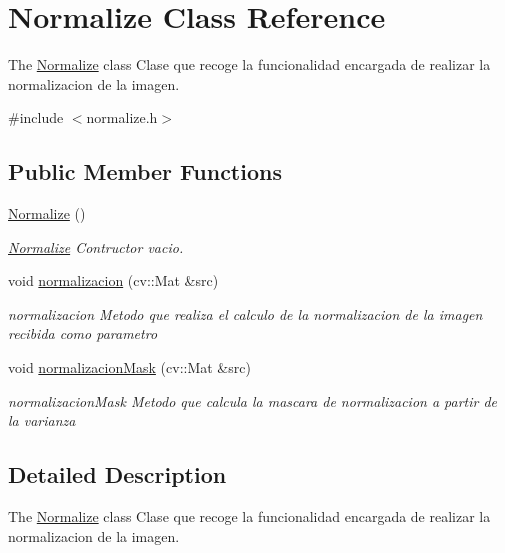 \hypertarget{class_normalize}{\section{Normalize Class Reference}
\label{class_normalize}
}


The \hyperlink{class_normalize}{Normalize} class Clase que recoge la funcionalidad encargada de realizar la normalizacion de la imagen.  




{\ttfamily \#include $<$normalize.\+h$>$}

\subsection*{Public Member Functions}
\begin{DoxyCompactItemize}
\item 
\hypertarget{class_normalize_a4e02803bd3999792686b756d8a486a6a}{\hyperlink{class_normalize_a4e02803bd3999792686b756d8a486a6a}{Normalize} ()}\label{class_normalize_a4e02803bd3999792686b756d8a486a6a}

\begin{DoxyCompactList}\small\item\em \hyperlink{class_normalize}{Normalize} Contructor vacio. \end{DoxyCompactList}\item 
void \hyperlink{class_normalize_a280fff45c1f616b80f1f5fce8006906c}{normalizacion} (cv\+::\+Mat \&src)
\begin{DoxyCompactList}\small\item\em normalizacion Metodo que realiza el calculo de la normalizacion de la imagen recibida como parametro \end{DoxyCompactList}\item 
void \hyperlink{class_normalize_a03e2994ccaf935c43bc3eebcc3ba0369}{normalizacion\+Mask} (cv\+::\+Mat \&src)
\begin{DoxyCompactList}\small\item\em normalizacion\+Mask Metodo que calcula la mascara de normalizacion a partir de la varianza \end{DoxyCompactList}\end{DoxyCompactItemize}


\subsection{Detailed Description}
The \hyperlink{class_normalize}{Normalize} class Clase que recoge la funcionalidad encargada de realizar la normalizacion de la imagen. 

